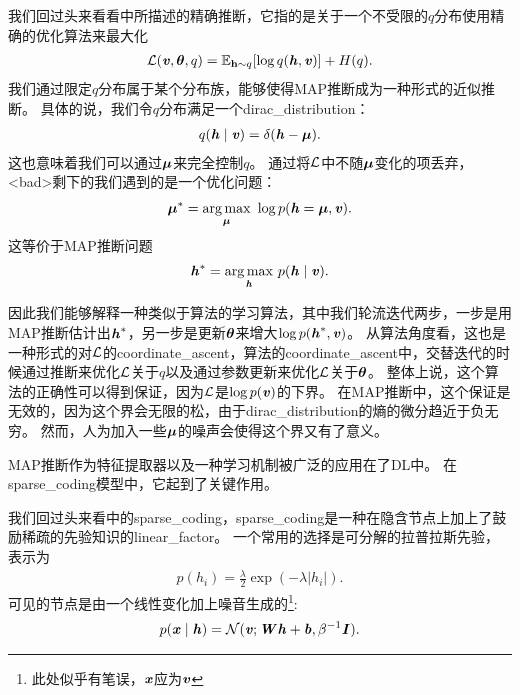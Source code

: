 我们回过头来看看中所描述的精确推断，它指的是关于一个不受限的$q$分布使用精确的优化算法来最大化
\begin{align}
\mathcal{L}(\boldsymbol{\mathit{v}},{\boldsymbol{\theta}},q)
 = \mathbb{E}_{\mathbf{h}\sim q}[\log q(\boldsymbol{\mathit{h}} , \boldsymbol{\mathit{v}})] + H(q).
\end{align}
我们通过限定$q$分布属于某个分布族，能够使得\gls{MAP}推断成为一种形式的近似推断。
具体的说，我们令$q$分布满足一个\gls{dirac_distribution}：
\begin{align}
q(\boldsymbol{\mathit{h}}\mid\boldsymbol{\mathit{v}}) = \delta(\boldsymbol{\mathit{h}} - {\boldsymbol{\mu}}).
\end{align}
这也意味着我们可以通过$\boldsymbol{\mu}$来完全控制$q$。
通过将$\mathcal{L}$中不随$\boldsymbol{\mu}$变化的项丢弃，<bad>剩下的我们遇到的是一个优化问题：
\begin{align}
\boldsymbol{\mu}^*  =  \underset{\boldsymbol{\mu}}{\arg\max}\ \log p(\boldsymbol{\mathit{h}} = \boldsymbol{\mu},\boldsymbol{\mathit{v}}).
\end{align}
这等价于\gls{MAP}推断问题
\begin{align}
\boldsymbol{\mathit{h}}^* = \underset{\boldsymbol{\mathit{h}}}{\arg\max}\  p(\boldsymbol{\mathit{h}}\mid\boldsymbol{\mathit{v}}).
\end{align}




因此我们能够解释一种类似于算法的学习算法，其中我们轮流迭代两步，一步是用\gls{MAP}推断估计出$\boldsymbol{\mathit{h}}^*$，另一步是更新$\boldsymbol{\theta}$来增大$\log p(\boldsymbol{\mathit{h}}^*,\boldsymbol{\mathit{v}})$。
从算法角度看，这也是一种形式的对$\mathcal{L}$的\gls{coordinate_ascent}，算法的\gls{coordinate_ascent}中，交替迭代的时候通过推断来优化$\mathcal{L}$关于$q$以及通过参数更新来优化$\mathcal{L}$关于$\boldsymbol{\theta}$。
整体上说，这个算法的正确性可以得到保证，因为$\mathcal{L}$是$\log p(\boldsymbol{\mathit{v}})$的下界。
在\gls{MAP}推断中，这个保证是无效的，因为这个界会无限的松，由于\gls{dirac_distribution}的熵的微分趋近于负无穷。
然而，人为加入一些$\boldsymbol{\mu}$的噪声会使得这个界又有了意义。



\gls{MAP}推断作为特征提取器以及一种学习机制被广泛的应用在了\gls{DL}中。
在\gls{sparse_coding}模型中，它起到了关键作用。


我们回过头来看中的\gls{sparse_coding}，\gls{sparse_coding}是一种在隐含节点上加上了鼓励稀疏的先验知识的\gls{linear_factor}。
一个常用的选择是可分解的拉普拉斯先验，表示为
\begin{align}
	p(h_i) = \frac{\lambda}{2}  \exp(-\lambda \vert h_i \vert).
\end{align}
可见的节点是由一个线性变化加上噪音生成的\footnote{此处似乎有笔误，$\boldsymbol{\mathit{x}}$应为$\boldsymbol{\mathit{v}}$}:
\begin{align}
	p(\boldsymbol{\mathit{x}}\mid\boldsymbol{\mathit{h}}) = \mathcal{N}(\boldsymbol{\mathit{v}};{\boldsymbol{\mathit{W}}}\boldsymbol{\mathit{h}} + \boldsymbol{\mathit{b}},\beta^{-1}{\boldsymbol{\mathit{I}}}).
\end{align}




